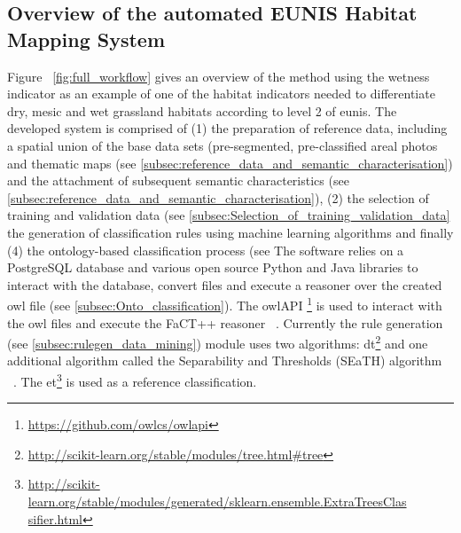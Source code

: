 \documentclass[authoryear,preprint,12pt,number]{elsarticle}
\begin{document}
\subsection{Overview of the automated EUNIS Habitat Mapping System}
Figure ~\ref{fig:full_workflow} gives an overview of the method using the
wetness indicator as an example of one of the habitat indicators needed to
differentiate dry, mesic and wet grassland habitats according to level 2 of
\gls{eunis}. The developed system is comprised of (1) the preparation of 
reference
data, including a spatial union of the base data sets (pre-segmented,
pre-classified areal photos and thematic maps (see
\ref{subsec:reference_data_and_semantic_characterisation}) and the attachment of
subsequent semantic characteristics (see 
\ref{subsec:reference_data_and_semantic_characterisation}), (2)
the selection of training and validation data (see
\ref{subsec:Selection_of_training_validation_data} the generation of
classification rules using machine learning algorithms and finally (4) the
ontology-based classification process (see The software relies on a PostgreSQL
database and various open source Python and Java libraries to interact with the
database, convert files and execute a reasoner over the created \gls{owl} file 
(see
\ref{subsec:Onto_classification}). The \gls{owl}API
\footnote{\url{https://github.com/owlcs/owlapi}} is used to interact with the
\gls{owl} files and execute the FaCT++ reasoner ~\citep{Tsarkov2006}. Currently 
the
rule generation (see \ref{subsec:rulegen_data_mining}) module uses two
algorithms: \gls{dt}\footnote{\url{
http://scikit-learn.org/stable/modules/tree.html\#tree} } and
one additional algorithm called the Separability and Thresholds (SEaTH)
algorithm ~\citep{Nussbaum2006}. The \gls{et}\footnote{\url{
http://scikit-learn.org/stable/modules/generated/sklearn.ensemble.ExtraTreesClas
sifier.html}}
is used as a reference classification.
\end{document}
